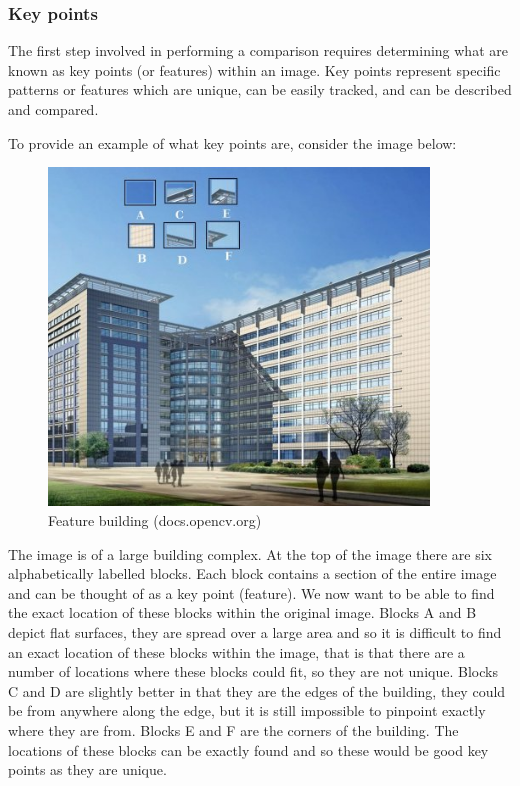 \documentclass[11pt,a4paper]{report}
\begin{document}
			\subsubsection{Key points}
				The first step involved in performing a comparison requires determining what are known as key points (or features) within an image. Key points represent specific patterns or features which are unique, can be easily tracked, and can be described and compared.
				
				To provide an example of what key points are, consider the image below:
				
				\begin{figure}[H]
					\centering
					\includegraphics[width=0.9\textwidth]{feature_building}
					\caption{Feature building (docs.opencv.org)}
					\label{fig:feature_building}
				\end{figure}
				
				The image is of a large building complex. At the top of the image there are six alphabetically labelled blocks. Each block contains a section of the entire image and can be thought of as a key point (feature). We now want to be able to find the exact location of these blocks within the original image. 
				Blocks A and B depict flat surfaces, they are spread over a large area and so it is difficult to find an exact location of these blocks within the image, that is that there are a number of locations where these blocks could fit, so they are not unique.
				Blocks C and D are slightly better in that they are the edges of the building, they could be from anywhere along the edge, but it is still impossible to pinpoint exactly where they are from.
				Blocks E and F are the corners of the building. The locations of these blocks can be exactly found and so these would be good key points as they are unique.
			
\end{document}
